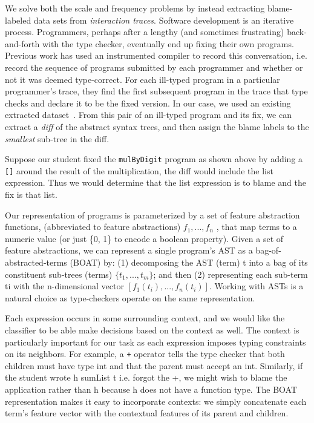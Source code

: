 We solve both the scale and frequency problems by instead extracting blame-labeled data sets from \emph{interaction traces}. Software development is an iterative process. Programmers, perhaps after a lengthy (and sometimes frustrating) back-and-forth with the type checker, eventually end up fixing their own programs. Previous work has used an instrumented \ocaml compiler to record this conversation, i.e. record the sequence of programs submitted by each programmer and whether or not it was deemed type-correct. For each ill-typed program in a particular programmer’s trace, they find the first subsequent program in the trace that type checks and declare it to be the fixed version. In our case, we used an existing extracted dataset~\citep[][]{yunounderstand, Seidel:2017}. From this pair of an ill-typed program and its fix, we can extract a \emph{diff} of the abstract syntax trees, and then assign the blame labels to the \emph{smallest} sub-tree in the diff.

 Suppose our student fixed the \texttt{mulByDigit} program as shown above by adding a \texttt{[]} around the result of the multiplication, the diff would include the list expression. Thus we would determine that the list expression is to blame and the fix is that list.

 Our representation of programs is parameterized by a set of feature abstraction functions, (abbreviated to feature abstractions) $f_1, ..., f_n$ , that map terms to a numeric value (or just \{0, 1\} to encode a boolean property). Given a set of feature abstractions, we can represent a single program’s AST as a bag-of-abstracted-terms (BOAT) by: (1) decomposing the AST (term) t into a bag of its constituent sub-trees (terms) $\{t_1, ..., t_m\}$; and then (2) representing each sub-term ti with the n-dimensional vector $[f_1(t_i), ..., f_n(t_i)]$. Working with ASTs is a natural choice as type-checkers operate on the same representation.

 Each expression occurs in some surrounding context, and we would like the classifier to be able make decisions based on the context as well. The context is particularly important for our task as each expression imposes typing constraints on its neighbors. For example, a \texttt{+} operator tells the type checker that both children must have type int and that the parent must accept an int. Similarly, if the student wrote h sumList t i.e. forgot the +, we might wish to blame the application rather than h because h does not have a function type. The BOAT representation makes it easy to incorporate contexts: we simply concatenate each term’s feature vector with the contextual features of its parent and children.

